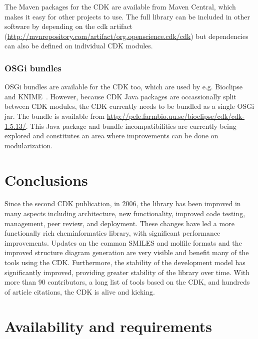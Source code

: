 \documentclass[10pt]{bmcart}
\begin{document}
The Maven packages for the CDK are available from Maven Central, which makes it
easy for other projects to use. The full library can be included in other
software by depending on the cdk artifact (\url{http://mvnrepository.com/artifact/org.openscience.cdk/cdk})
but dependencies can also be defined on individual CDK modules.

\subsubsection*{OSGi bundles}

OSGi bundles are available for the CDK too, which are used by e.g.
Bioclipse~\cite{spjuth2007bioclipse,spjuth2009bioclipse} and
KNIME~\cite{Beisken2013}. However, because CDK Java packages are occassionally
split between CDK modules, the CDK currently needs to be bundled as a single
OSGi jar. The bundle is available from \url{http://pele.farmbio.uu.se/bioclipse/cdk/cdk-1.5.13/}.
This Java package and bundle incompatibilities are currently being explored and
constitutes an area where improvements can be done on modularization.



\section*{Conclusions}

Since the second CDK publication, in 2006, the library has been improved
in many aspects including architecture, new functionality, improved
code testing, management, peer review, and deployment. These changes have led a more
functionally rich cheminformatics library, with significant
performance improvements. Updates on the common SMILES and molfile
formats and the improved structure diagram generation are very visible
and benefit many of the tools using the CDK.  Furthermore, the
stability of the development model has significantly improved,
providing greater stability of the library over time.
With more than 90 contributors, a long list of tools based on the CDK, and
hundreds of article citations, the CDK is alive and kicking.

\section*{Availability and requirements}
\end{document}
